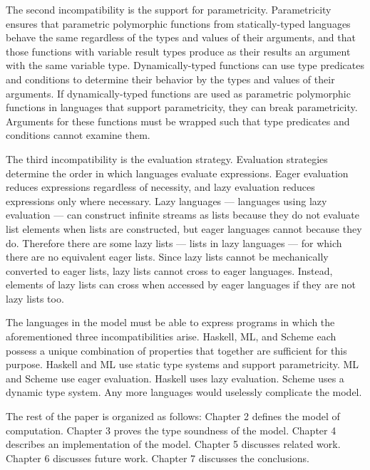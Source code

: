 The second incompatibility is the support for parametricity.  Parametricity ensures that parametric polymorphic functions from statically-typed languages behave the same regardless of the types and values of their arguments, and that those functions with variable result types produce as their results an argument with the same variable type.  Dynamically-typed functions can use type predicates and conditions to determine their behavior by the types and values of their arguments.  If dynamically-typed functions are used as parametric polymorphic functions in languages that support parametricity, they can break parametricity.  Arguments for these functions must be wrapped such that type predicates and conditions cannot examine them.

The third incompatibility is the evaluation strategy.  Evaluation strategies determine the order in which languages evaluate expressions.  Eager evaluation reduces expressions regardless of necessity, and lazy evaluation reduces expressions only where necessary.  Lazy languages --- languages using lazy evaluation --- can construct infinite streams as lists because they do not evaluate list elements when lists are constructed, but eager languages cannot because they do.  Therefore there are some lazy lists --- lists in lazy languages --- for which there are no equivalent eager lists.  Since lazy lists cannot be mechanically converted to eager lists, lazy lists cannot cross to eager languages.  Instead, elements of lazy lists can cross when accessed by eager languages if they are not lazy lists too.

The languages in the model must be able to express programs in which the aforementioned three incompatibilities arise.  Haskell, ML, and Scheme each possess a unique combination of properties that together are sufficient for this purpose.  Haskell and ML use static type systems and support parametricity.  ML and Scheme use eager evaluation.  Haskell uses lazy evaluation.  Scheme uses a dynamic type system.  Any more languages would uselessly complicate the model.

The rest of the paper is organized as follows: Chapter 2 defines the model of computation.  Chapter 3 proves the type soundness of the model.  Chapter 4 describes an implementation of the model.  Chapter 5 discusses related work.  Chapter 6 discusses future work.  Chapter 7 discusses the conclusions.